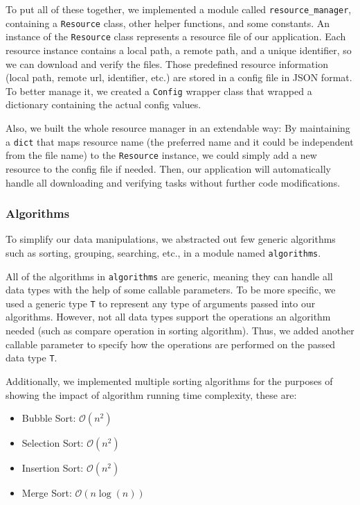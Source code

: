 \documentclass[fontsize=11pt]{article}
\newcommand{\bigO}{\mathcal{O}}
\begin{document}
    To put all of these together, we implemented a module called \verb|resource_manager|, containing a \verb|Resource| class, other helper functions, and some constants. An instance of the \verb|Resource| class represents a resource file of our application. Each resource instance contains a local path, a remote path, and a unique identifier, so we can download and verify the files. Those predefined resource information (local path, remote url, identifier, etc.) are stored in a config file in JSON format. To better manage it, we created a \verb|Config| wrapper class that wrapped a dictionary containing the actual config values. 

    Also, we built the whole resource manager in an extendable way: By maintaining a \verb|dict| that maps resource name (the preferred name and it could be independent from the file name) to the \verb|Resource| instance, we could simply add a new resource to the config file if needed. Then, our application will automatically handle all downloading and verifying tasks without further code modifications.

    \subsubsection{Algorithms}

    To simplify our data manipulations, we abstracted out few generic algorithms such as sorting, grouping, searching, etc., in a module named \verb|algorithms|.

    All of the algorithms in \verb|algorithms| are generic, meaning they can handle all data types with the help of some callable parameters. To be more specific, we used a generic type \verb|T| to represent any type of arguments passed into our algorithms. However, not all data types support the operations an algorithm needed (such as compare operation in sorting algorithm). Thus, we added another callable parameter to specify how the operations are performed on the passed data type \verb|T|.

    Additionally, we implemented multiple sorting algorithms for the purposes of showing the impact of algorithm running time complexity, these are:
    
    \begin{itemize}
        \item Bubble Sort: $\bigO(n^2)$
        \item Selection Sort: $\bigO(n^2)$
        \item Insertion Sort: $\bigO(n^2)$
        \item Merge Sort: $\bigO(n\log(n))$
    \end{itemize}
\end{document}
